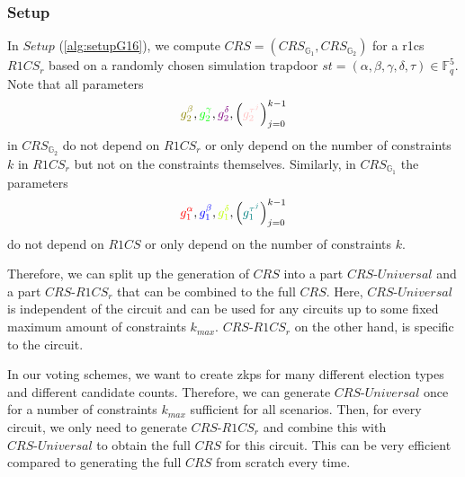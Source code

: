 \subsubsection{Setup}
\label{section:software:snarkjsSetup}
In $Setup$ (\cref{alg:setupG16}), we compute $CRS=(CRS_{\mathbb{G}_1}, CRS_{\mathbb{G}_2})$ for a \gls{r1cs} $R1CS_r$ based on a randomly chosen simulation trapdoor $st=(\alpha, \beta, \gamma, \delta, \tau)\in\mathbb{F}_q^5$.
Note that all parameters 
\begin{align*}
    \textcolor{olive}{g_2^\beta}, \textcolor{green}{g_2^\gamma},\textcolor{violet}{g_2^\delta},\left(\textcolor{pink}{g_2^{\tau^j}}\right)_{j=0}^{k-1}
\end{align*}
in $CRS_{\mathbb{G}_2}$ do not depend on $R1CS_r$ or only depend on the number of constraints $k$ in $R1CS_r$ but not on the constraints themselves.
Similarly, in $CRS_{\mathbb{G}_1}$ the parameters 
\begin{align*}
    \textcolor{red}{g_1^\alpha},\textcolor{blue}{g_1^\beta},\textcolor{lime}{g_1^\delta},\left(\textcolor{teal}{g_1^{\tau^j}}\right)_{j=0}^{k-1}
\end{align*}
do not depend on $R1CS$ or only depend on the number of constraints $k$.

Therefore, we can split up the generation of $CRS$ into a part $CRS\text{-}Universal$ and a part $CRS\text{-}R1CS_r$ that can be combined to the full $CRS$.
Here, $CRS\text{-}Universal$ is independent of the circuit and can be used for any circuits up to some fixed maximum amount of constraints $k_{max}$.
$CRS\text{-}R1CS_r$ on the other hand, is specific to the circuit.

In our voting schemes, we want to create \glspl{zkp} for many different election types and different candidate counts.
Therefore, we can generate $CRS\text{-}Universal$ once for a number of constraints $k_{max}$ sufficient for all scenarios.
Then, for every circuit, we only need to generate $CRS\text{-}R1CS_r$ and combine this with $CRS\text{-}Universal$ to obtain the full $CRS$ for this circuit.
This can be very efficient compared to generating the full $CRS$ from scratch every time.


